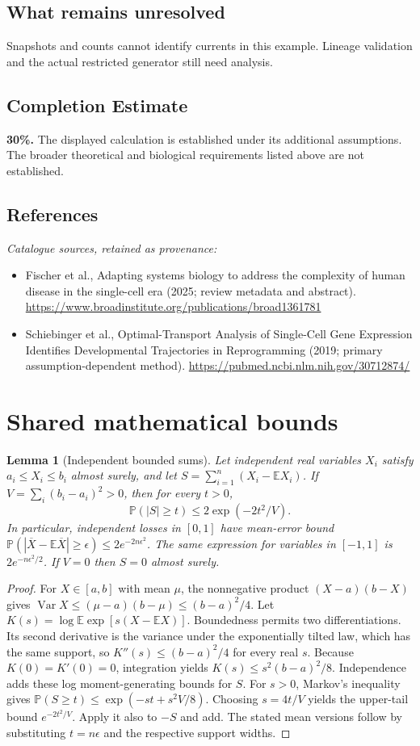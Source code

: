 \documentclass[11pt]{article}
\newcommand{\E}{\mathbb E}
\newcommand{\Prob}{\mathbb P}
\DeclareMathOperator{\Var}{Var}
\providecommand{\E}{\mathbb E}
\providecommand{\Prob}{\mathbb P}
\providecommand{\Var}{\operatorname{Var}}
\newtheorem{sharedlemma}{Lemma}[section]
\begin{document}
\subsection{What remains unresolved}
Snapshots and counts cannot identify currents in this example. Lineage validation and the actual restricted generator still need analysis.
\subsection{Completion Estimate}
\textbf{30\%.} The displayed calculation is established under its additional assumptions. The broader theoretical and biological requirements listed above are not established.
\subsection{References}
\noindent\emph{Catalogue sources, retained as provenance:}
\begin{itemize}
\item Fischer et al., Adapting systems biology to address the complexity of human disease in the single-cell era (2025; review metadata and abstract). \url{https://www.broadinstitute.org/publications/broad1361781}
\item Schiebinger et al., Optimal-Transport Analysis of Single-Cell Gene Expression Identifies Developmental Trajectories in Reprogramming (2019; primary assumption-dependent method). \url{https://pubmed.ncbi.nlm.nih.gov/30712874/}
\end{itemize}
\clearpage


\appendix
\section{Shared mathematical bounds}\label{app:bounds}
\begin{sharedlemma}[Independent bounded sums]\label{lem:bounded}
Let independent real variables $X_i$ satisfy $a_i\leq X_i\leq b_i$ almost surely,
and let $S=\sum_{i=1}^n(X_i-\E X_i)$. If
$V=\sum_i(b_i-a_i)^2>0$, then for every $t>0$,
\[
 \Prob(|S|\geq t)\leq 2\exp(-2t^2/V).
\]
In particular, independent losses in $[0,1]$ have mean-error bound
$\Prob(|\overline X-\E\overline X|\geq\epsilon)
\leq2e^{-2n\epsilon^2}$. The same expression for variables in $[-1,1]$
is $2e^{-n\epsilon^2/2}$. If $V=0$ then $S=0$ almost surely.
\end{sharedlemma}
\begin{proof}
For $X\in[a,b]$ with mean $\mu$, the nonnegative product
$(X-a)(b-X)$ gives
$\Var X\leq(\mu-a)(b-\mu)\leq(b-a)^2/4$.
Let $K(s)=\log\E\exp[s(X-\E X)]$.
Boundedness permits two differentiations. Its second derivative is the variance
under the exponentially tilted law, which has the same support, so
$K''(s)\leq(b-a)^2/4$ for every real $s$.
Because $K(0)=K'(0)=0$, integration yields
$K(s)\leq s^2(b-a)^2/8$.
Independence adds these log moment-generating bounds for $S$.
For $s>0$, Markov's inequality gives
$\Prob(S\geq t)\leq\exp(-st+s^2V/8)$.
Choosing $s=4t/V$ yields the upper-tail bound $e^{-2t^2/V}$.
Apply it also to $-S$ and add. The stated mean versions follow by substituting
$t=n\epsilon$ and the respective support widths.
\end{proof}
\end{document}
